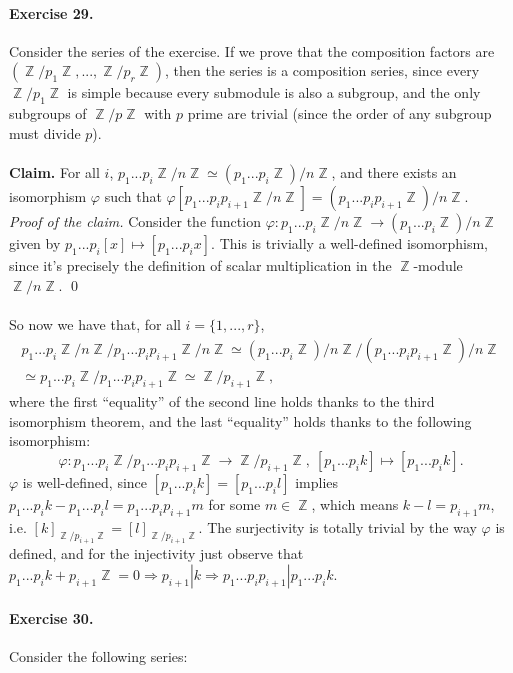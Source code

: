 \documentclass[12pt,a4paper]{report}
\theoremstyle{definition}
\theoremstyle{num.custom-title}
\DeclareMathOperator{\Z}{\mathbb{Z}}
\DeclareMathOperator{\imp}{\Rightarrow}
\renewcommand{\phi}{\varphi}
\begin{document}
\paragraph{Exercise 29.} Consider the series of the exercise. If we prove that the composition factors are $(\Z/p_1\Z, ..., \Z/p_r\Z)$, then the series is a composition series, since every $\Z/p_1\Z$ is simple because every submodule is also a subgroup, and the only subgroups of $\Z/p\Z$ with $p$ prime are trivial (since the order of any subgroup must divide $p$).\\
\\
\noindent\textbf{Claim.} For all $i$, $p_1...p_i \Z/n\Z \simeq (p_1...p_i\Z)/n\Z$, and there exists an isomorphism $\phi$ such that $\phi[p_1...p_i p_{i+1} \Z/n\Z] = (p_1...p_i p_{i+1} \Z)/n\Z$.\\
\emph{Proof of the claim.} Consider the function $\phi: p_1...p_i \Z/n\Z \to (p_1...p_i\Z)/n\Z$ given by $p_1...p_i [x] \mapsto [p_1...p_i x]$. This is trivially a well-defined isomorphism, since it's precisely the definition of scalar multiplication in the $\Z$-module $\Z/n\Z$. \qed
\\
\\
So now we have that, for all $i=\{1,...,r\}$, 
\begin{multline*}
p_1...p_i \Z/n\Z / p_1...p_i p_{i+1} \Z/n\Z \simeq (p_1...p_i \Z)/n\Z / (p_1...p_i p_{i+1} \Z)/n\Z \\
\simeq p_1...p_i \Z / p_1...p_i p_{i+1} \Z \simeq \Z/p_{i+1}\Z,
\end{multline*}
where the first ``equality'' of the second line holds thanks to the third isomorphism theorem, and the last ``equality'' holds thanks to the following isomorphism:
\[
\phi: p_1...p_i \Z / p_1...p_i p_{i+1} \Z \to \Z/p_{i+1}\Z, \ [p_1...p_i k] \mapsto [p_1...p_i k].
\]
$\phi$ is well-defined, since $[p_1...p_i k] = [p_1...p_i l]$ implies $p_1...p_i k - p_1...p_i l = p_1...p_i p_{i+1} m$ for some $m \in \Z$, which means $k-l=p_{i+1} m$, i.e. $[k]_{\Z/p_{i+1}\Z} = [l]_{\Z/p_{i+1}\Z}$. The surjectivity is totally trivial by the way $\phi$ is defined, and for the injectivity just observe that $p_1...p_i k + p_{i+1}\Z = 0 \imp p_{i+1}|k \imp p_1...p_i p_{i+1} | p_1...p_i k$.

\paragraph{Exercise 30.} Consider the following series:
\end{document}
